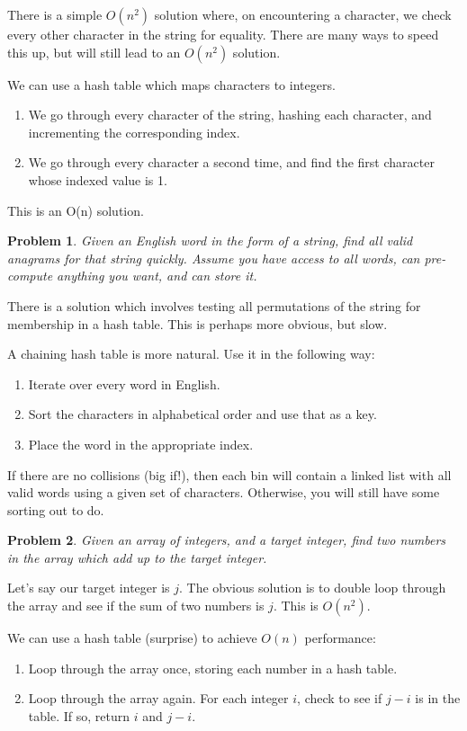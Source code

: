 \documentclass{article}
\newtheorem{problem}{Problem}
\begin{document}
There is a simple $O(n^2)$ solution where, on encountering a character, we check every other character in the string for equality.  There are many ways to speed this up, but will still lead to an $O(n^2)$ solution.

We can use a hash table which maps characters to integers.
\begin{enumerate}
\item We go through every character of the string, hashing each character, and incrementing the corresponding index.
\item We go through every character a second time, and find the first character whose indexed value is 1.
\end{enumerate}
This is an O(n) solution.

\begin{problem}
{Given an English word in the form of a string, find all valid anagrams for that string quickly.  Assume you have access to all words, can pre-compute anything you want, and can store it.}
\end{problem}

There is a solution which involves testing all permutations of the string for membership in a hash table.  This is perhaps more obvious, but slow.

A chaining hash table is more natural.  Use it in the following way:
\begin{enumerate}
\item Iterate over every word in English.
\item Sort the characters in alphabetical order and use that as a key.
\item Place the word in the appropriate index.
\end{enumerate}

If there are no collisions (big if!), then each bin will contain a linked list with all valid words using a given set of characters.  Otherwise, you will still have some sorting out to do.

\begin{problem}
{Given an array of integers, and a target integer, find two numbers in the array which add up to the target integer.}
\end{problem}

Let's say our target integer is $j$.  The obvious solution is to double loop through the array and see if the sum of two numbers is $j$.  This is $O(n^2)$.

We can use a hash table (surprise) to achieve $O(n)$ performance:
\begin{enumerate}
\item Loop through the array once, storing each number in a hash table.
\item Loop through the array again.  For each integer $i$, check to see if $j-i$ is in the table.  If so, return $i$ and $j-i$.
\end{enumerate}
\end{document}
